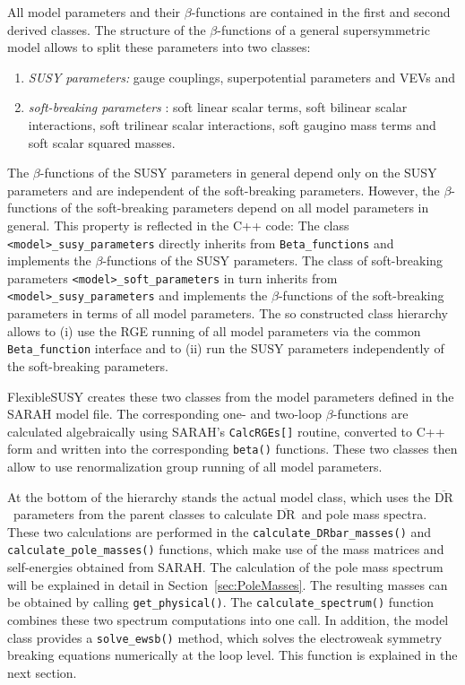 \documentclass[final,3p,11pt,pdflatex]{elsarticle}
\makeatletter
\newcommand{\fs}{FlexibleSUSY\@\xspace}
\newcommand{\code}[1]{\lstinline|#1|}  %
\newcommand{\textoverline}[1]{$\overline{\mbox{#1}}$}
\newcommand{\DRbar}{\textoverline{DR}\xspace}
\newcommand{\secref}[1]{Section~\ref{#1}}
\makeatother
\begin{document}
All model parameters and their $\beta$-functions are contained in
the first and second derived classes.  The structure of the
$\beta$-functions of a general supersymmetric model
\cite{Jones:1974pg,Jones:1983vk,West:1984dg,Martin:1993yx,Yamada:1993ga,MV94,Fonseca:2011vn,Yam94,Sperling:2013eva,Sperling:2013xqa}
allows to split these parameters into two classes:
%
\begin{enumerate}
\item \emph{SUSY parameters:} gauge couplings, superpotential
  parameters and VEVs and
\item \emph{soft-breaking parameters} \cite{Girardello:1981wz}: soft
  linear scalar terms, soft bilinear scalar interactions, soft
  trilinear scalar interactions, soft gaugino mass terms and soft
  scalar squared masses.
\end{enumerate}
%
The $\beta$-functions of the SUSY parameters in general depend only on
the SUSY parameters and are independent of the soft-breaking
parameters.  However, the $\beta$-functions of the soft-breaking
parameters depend on all model parameters in general.
%
This property is reflected in the C++ code: The class
\code{<model>_susy_parameters} directly inherits from
\code{Beta_functions} and implements the $\beta$-functions of the SUSY
parameters.  The class of soft-breaking parameters
\code{<model>_soft_parameters} in turn inherits from
\code{<model>_susy_parameters} and implements the $\beta$-functions of
the soft-breaking parameters in terms of all model parameters.  The so
constructed class hierarchy allows to (i) use the RGE running of all
model parameters via the common \code{Beta_function} interface and to
(ii) run the SUSY parameters independently of the soft-breaking
parameters.

\fs creates these two classes from the model parameters defined in the
SARAH model file.  The corresponding one- and two-loop
$\beta$-functions are calculated algebraically using SARAH's
\code{CalcRGEs[]} routine, converted to C++ form and written into the
corresponding \code{beta()} functions.  These two classes then allow
to use renormalization group running of all model parameters.

At the bottom of the hierarchy stands the actual model class, which
uses the \DRbar\ parameters from the parent classes to calculate
\DRbar\ and pole mass spectra.  These two calculations are performed
in the \code{calculate_DRbar_masses()} and
\code{calculate_pole_masses()} functions, which make use of the mass
matrices and self-energies obtained from SARAH.  The calculation of
the pole mass spectrum will be explained in detail in
\secref{sec:PoleMasses}.  The resulting masses can be obtained by
calling \code{get_physical()}.  The \code{calculate_spectrum()}
function combines these two spectrum computations into one call.  In
addition, the model class provides a \code{solve_ewsb()} method, which
solves the electroweak symmetry breaking equations numerically at the
loop level.  This function is explained in the next section.
\end{document}
